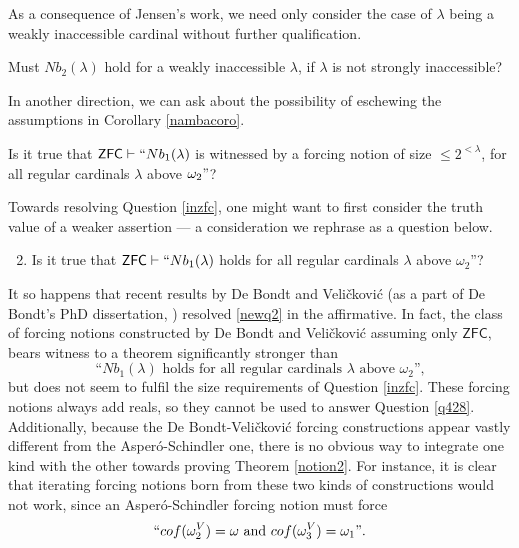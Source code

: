 \documentclass[12pt]{article}
\numberwithin{equation}{section}
\begin{document}
As a consequence of Jensen's work, we need only consider the case of $\lambda$ being a weakly inaccessible cardinal without further qualification.

\begin{ques}\label{q428}
Must $Nb_2(\lambda)$ hold for a weakly inaccessible $\lambda$, if $\lambda$ is not strongly inaccessible?
\end{ques}

In another direction, we can ask about the possibility of eschewing the assumptions in Corollary \ref{nambacoro}.

\begin{ques}\label{inzfc}
Is it true that $\mathsf{ZFC} \vdash ``Nb_1(\lambda)$ is witnessed by a forcing notion of size $\leq 2^{<\lambda}$, for all regular cardinals $\lambda$ above $\omega_2"$?
\end{ques}

Towards resolving Question \ref{inzfc}, one might want to first consider the truth value of a weaker assertion --- a consideration we rephrase as a question below.

\begin{enumerate}[label=(Q\arabic*)]
    \setcounter{enumi}{1}
    \item\label{newq2} Is it true that $\mathsf{ZFC} \vdash ``Nb_1(\lambda)$ holds for all regular cardinals $\lambda$ above $\omega_2$''?
\end{enumerate}

It so happens that recent results by De Bondt and Veli\v{c}kovi\'{c} (as a part of De Bondt's PhD dissertation, \cite{bendb}) resolved \ref{newq2} in the affirmative. In fact, the class of forcing notions constructed by De Bondt and Veli\v{c}kovi\'{c} assuming only $\mathsf{ZFC}$, bears witness to a theorem significantly stronger than 
\begin{equation*}
    \text{``}Nb_1(\lambda) \text{ holds for all regular cardinals } \lambda \text{ above } \omega_2 \text{'',}
\end{equation*}
but does not seem to fulfil the size requirements of Question \ref{inzfc}. These forcing notions always add reals, so they cannot be used to answer Question \ref{q428}. Additionally, because the De Bondt-Veli\v{c}kovi\'{c} forcing constructions appear vastly different from the Asper\'{o}-Schindler one, there is no obvious way to integrate one kind with the other towards proving Theorem \ref{notion2}. For instance, it is clear that iterating forcing notions born from these two kinds of constructions would not work, since an Asper\'{o}-Schindler forcing notion must force 
\begin{equation*}
    ``cof(\omega_2^V) = \omega \text{ and } cof(\omega_3^V) = \omega_1" \text{.}
\end{equation*}
\end{document}
